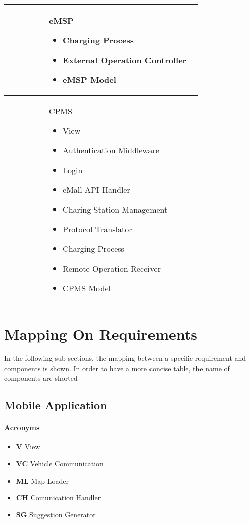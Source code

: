 \begin{longtable}{|p{0.20\linewidth}p{0.75\linewidth}|}
    \rowcolor{bluepoli!5}  & eMSP  \newline
    \begin{itemize}
        \item Charging Process
        \item External Operation Controller
        \item eMSP Model
    \end{itemize} \\
    \hline
    \rowcolor{bluepoli!5}  & CPMS  \newline
    \begin{itemize}
        \item View
        \item Authentication Middleware
        \item Login
        \item eMall API Handler
        \item Charing Station Management
        \item Protocol Translator
        \item Charging Process
        \item Remote Operation Receiver
        \item CPMS Model
    \end{itemize} \\
    \hline
\end{longtable}
\newpage
\section{Mapping On Requirements}
In the following sub sections, the mapping between a specific requirement and components is shown. In order to have a more concise table, the name of components are shorted
\subsection{Mobile Application}
\paragraph{Acronyms} 
\begin{itemize} [label={--}]
    \item \textbf{V} View
    \item \textbf{VC} Vehicle Communication
    \item \textbf{ML} Map Loader
    \item \textbf{CH} Comunication Handler
    \item \textbf{SG} Suggestion Generator
\end{itemize}

